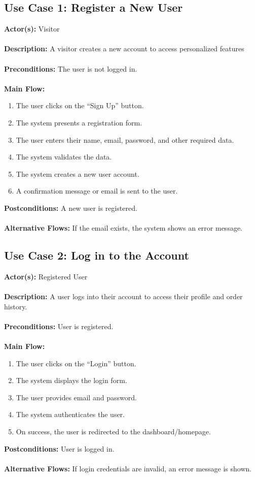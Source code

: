 \documentclass[a4paper,12pt]{article}
\begin{document}
	\subsection*{Use Case 1: Register a New User}
	\textbf{Actor(s):} Visitor \\ \\
	\textbf{Description:} A visitor creates a new account to access personalized features \\ \\
	\textbf{Preconditions:} The user is not logged in. \\ \\
	\textbf{Main Flow:}
	\begin{enumerate}
    		\item The user clicks on the ``Sign Up'' button.
    		\item The system presents a registration form.
    		\item The user enters their name, email, password, and other required data.
    		\item The system validates the data.
    		\item The system creates a new user account.
    		\item A confirmation message or email is sent to the user.
    \end{enumerate}
    \textbf{Postconditions:} A new user is registered. \\ \\
    \textbf{Alternative Flows:} If the email exists, the system shows an error message.


    \subsection*{Use Case 2: Log in to the Account}
	\textbf{Actor(s):} Registered User \\ \\
	\textbf{Description:} A user logs into their account to access their profile and order history. \\ \\
	\textbf{Preconditions:} User is registered. \\ \\
	\textbf{Main Flow:}
	\begin{enumerate}
  		\item The user clicks on the ``Login'' button.
  		\item The system displays the login form.
  		\item The user provides email and password.
  		\item The system authenticates the user.
  		\item On success, the user is redirected to the dashboard/homepage.
	\end{enumerate}
	\textbf{Postconditions:} User is logged in. \\ \\
	\textbf{Alternative Flows:} If login credentials are invalid, an error message is shown.
\end{document}
